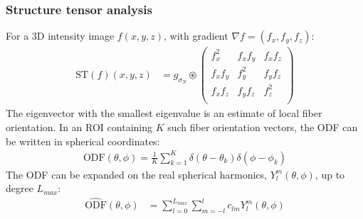 \documentclass[presentation, 10pt]{beamer}
\begin{document}
\begin{frame}
  \frametitle{Structure tensor analysis}
  \vspace{1em}
  For a 3D intensity image $f(x,y,z)$, with gradient
  $\nabla f = (f_x, f_y, f_z)$:
  \begin{align}
    \text{ST}\left(f\right)(x,y,z) &= g_{\sigma_N} \circledast
    \begin{pmatrix}
      f_x^2 & f_x f_y & f_x f_z \\
      f_x f_y & f_y^2 & f_y f_z \\
      f_x f_z & f_y f_z & f_z^2 \\
    \end{pmatrix}
    \nonumber
  \end{align}
  The eigenvector with the smallest eigenvalue is an estimate of local fiber
  orientation. In an ROI containing $K$ such fiber orientation vectors, the ODF
  can be written in spherical coordinates:
  \begin{align}
    \text{ODF}(\theta, \phi) = \frac{1}{K}\sum_{k=1}^K \delta(\theta - \theta_k)\delta(\phi - \phi_k)\nonumber
  \end{align}
  The ODF can be expanded on the real spherical harmonics, $Y_l^m(\theta, \phi)$, up to degree $L_{max}$:
  \begin{align}
    \hat{\text{ODF}}(\theta, \phi) &= \sum_{l=0}^{L_{max}}\sum_{m=-l}^l c_{lm}Y_l^m(\theta, \phi)\nonumber\\
  \end{align}
\end{frame}
\end{document}
